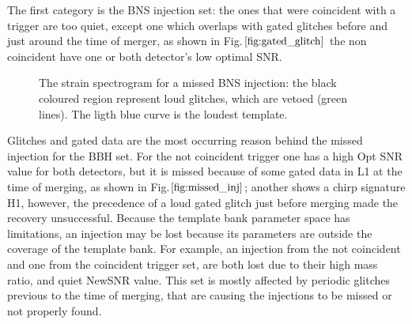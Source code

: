 \documentclass[binding=0.6cm, LaM]{sapthesis}
\begin{document}
	The first category is the BNS injection set: 
	the ones that were coincident with a trigger are too quiet,
	except one which overlaps with gated glitches before and just around the time of merger, as shown in Fig.$\ref{fig:gated_glitch}$
	the non coincident have one or both detector's low optimal SNR.
 		\begin{figure}[h]
                        \noindent
                        \label{gated_glitch}
                        \centering
                        \caption{The strain spectrogram for a missed BNS injection: the black coloured region represent loud glitches, which are vetoed (green lines). The ligth blue curve is the loudest template. }
                         \label{fig:gated_glitch}
                \end{figure}
	Glitches and gated data are the most occurring reason behind the missed injection for the BBH set.
	For the not coincident trigger one has a high Opt SNR value for both detectors, 
	but it is missed because of some gated data in L1 at the time of merging, as shown in Fig.$\ref{fig:missed_inj}$;
 	another shows a chirp signature H1, however, the precedence of a loud gated glitch just before merging
	made the recovery  unsuccessful.
	Because the template bank  parameter space has limitations,
	an injection may be lost because its parameters are outside the coverage 
	of the template bank. 
	For example, an injection from the not coincident and one from the coincident trigger set, 
	are both lost due to their high mass ratio, and quiet NewSNR value.
	This set is mostly affected by	 periodic glitches previous to the time of merging,
	that are  causing the injections to be missed  or not properly found.                
\end{document}
